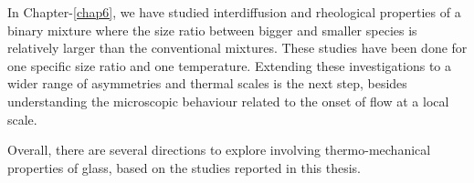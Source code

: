 In Chapter-\ref{chap6}, we have studied interdiffusion and rheological properties of a binary mixture where the size ratio between bigger and smaller species is relatively larger than the conventional mixtures. These studies have been done for one specific size ratio and one temperature. Extending these investigations to a wider range of asymmetries and thermal scales is the next step, besides understanding the microscopic behaviour related to the onset of flow at a local scale. 

Overall, there are several directions to explore involving thermo-mechanical properties of glass, based on the studies reported in this thesis.
